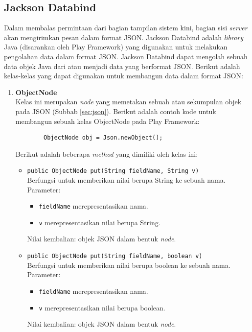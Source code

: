 \subsection{Jackson Databind}
\label{sec:jacksondatabind}
Dalam membalas permintaan dari bagian tampilan sistem kini, bagian sisi \textit{server} akan mengirimkan pesan dalam format JSON. Jackson Databind adalah \textit{library} Java (disarankan oleh Play Framework) yang digunakan untuk melakukan pengolahan data dalam format JSON\cite{jackson}. Jackson Databind dapat mengolah sebuah data objek Java dari atau menjadi data yang berformat JSON. Berikut adalah kelas-kelas yang dapat digunakan untuk membangun data dalam format JSON:
\begin{enumerate}
	\item \textbf{ObjectNode}\\
	Kelas ini merupakan \textit{node} yang memetakan sebuah atau sekumpulan objek pada JSON (Subbab \ref{sec:json}). Berikut adalah contoh kode untuk membangun sebuah kelas ObjectNode pada Play Framework:
	\begin{lstlisting}
		ObjectNode obj = Json.newObject();
	\end{lstlisting}
	Berikut adalah beberapa \textit{method} yang dimiliki oleh kelas ini:
		\begin{itemize}
			\item \texttt{public ObjectNode put(String fieldName, String v)}\\
			Berfungsi untuk memberikan nilai berupa String ke sebuah nama.\\
			Parameter:
				\begin{itemize}
					\item \texttt{fieldName} merepresentasikan nama.
					\item \texttt{v} merepresentasikan nilai berupa String.
				\end{itemize}
			Nilai kembalian: objek JSON dalam bentuk \textit{node}.
			\item \texttt{public ObjectNode put(String fieldName, boolean v)}\\
			Berfungsi untuk memberikan nilai berupa boolean ke sebuah nama.\\
			Parameter:
				\begin{itemize}
					\item \texttt{fieldName} merepresentasikan nama.
					\item \texttt{v} merepresentasikan nilai berupa boolean.
				\end{itemize}
			Nilai kembalian: objek JSON dalam bentuk \textit{node}.

\end{itemize}
\end{enumerate}
